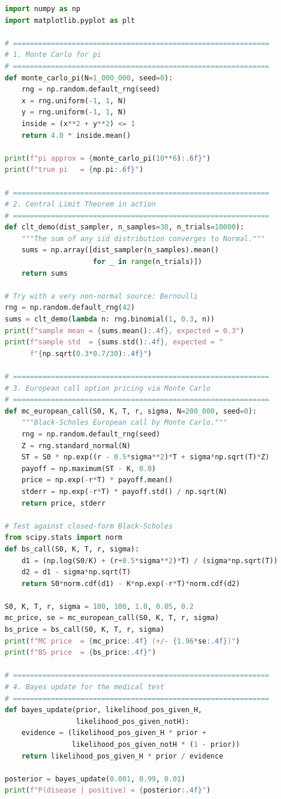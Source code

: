 \begin{lstlisting}[language=Python, caption={probability.py · 蒙特卡洛求 $\pi$ 与期权定价}]
import numpy as np
import matplotlib.pyplot as plt

# =============================================================
# 1. Monte Carlo for pi
# =============================================================
def monte_carlo_pi(N=1_000_000, seed=0):
    rng = np.random.default_rng(seed)
    x = rng.uniform(-1, 1, N)
    y = rng.uniform(-1, 1, N)
    inside = (x**2 + y**2) <= 1
    return 4.0 * inside.mean()

print(f"pi approx = {monte_carlo_pi(10**6):.6f}")
print(f"true pi   = {np.pi:.6f}")

# =============================================================
# 2. Central Limit Theorem in action
# =============================================================
def clt_demo(dist_sampler, n_samples=30, n_trials=10000):
    """The sum of any iid distribution converges to Normal."""
    sums = np.array([dist_sampler(n_samples).mean()
                     for _ in range(n_trials)])
    return sums

# Try with a very non-normal source: Bernoulli
rng = np.random.default_rng(42)
sums = clt_demo(lambda n: rng.binomial(1, 0.3, n))
print(f"sample mean = {sums.mean():.4f}, expected = 0.3")
print(f"sample std  = {sums.std():.4f}, expected = "
      f"{np.sqrt(0.3*0.7/30):.4f}")

# =============================================================
# 3. European call option pricing via Monte Carlo
# =============================================================
def mc_european_call(S0, K, T, r, sigma, N=200_000, seed=0):
    """Black-Scholes European call by Monte Carlo."""
    rng = np.random.default_rng(seed)
    Z = rng.standard_normal(N)
    ST = S0 * np.exp((r - 0.5*sigma**2)*T + sigma*np.sqrt(T)*Z)
    payoff = np.maximum(ST - K, 0.0)
    price = np.exp(-r*T) * payoff.mean()
    stderr = np.exp(-r*T) * payoff.std() / np.sqrt(N)
    return price, stderr

# Test against closed-form Black-Scholes
from scipy.stats import norm
def bs_call(S0, K, T, r, sigma):
    d1 = (np.log(S0/K) + (r+0.5*sigma**2)*T) / (sigma*np.sqrt(T))
    d2 = d1 - sigma*np.sqrt(T)
    return S0*norm.cdf(d1) - K*np.exp(-r*T)*norm.cdf(d2)

S0, K, T, r, sigma = 100, 100, 1.0, 0.05, 0.2
mc_price, se = mc_european_call(S0, K, T, r, sigma)
bs_price = bs_call(S0, K, T, r, sigma)
print(f"MC price  = {mc_price:.4f} (+/- {1.96*se:.4f})")
print(f"BS price  = {bs_price:.4f}")

# =============================================================
# 4. Bayes update for the medical test
# =============================================================
def bayes_update(prior, likelihood_pos_given_H,
                 likelihood_pos_given_notH):
    evidence = (likelihood_pos_given_H * prior +
                likelihood_pos_given_notH * (1 - prior))
    return likelihood_pos_given_H * prior / evidence

posterior = bayes_update(0.001, 0.99, 0.01)
print(f"P(disease | positive) = {posterior:.4f}")
\end{lstlisting}

